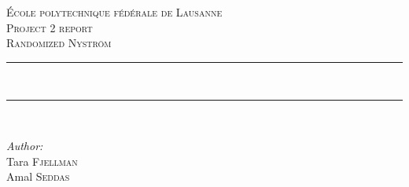 \begin{titlepage}
    \newcommand{\HRule}{\rule{\linewidth}{0.5mm}} %
    
    \center  %
     
    
    \vspace{3cm}
    \textsc{\LARGE École polytechnique fédérale de Lausanne}\\[1.5cm] %
    
    \textsc{\Large Project 2 report}\\[0.5cm] %
    \textsc{\large Randomized Nystr\"om
    }\\[0.5cm] %
    
    
    \HRule \\[0.4cm] %
    
    
    
    \HRule \\[1.5cm]
     
    
    \begin{minipage}{0.4\textwidth}
    \begin{flushleft} \large
    
    \emph{Author:}\\
    Tara \textsc{Fjellman}\\
    Amal \textsc{Seddas}\\
    
    
    
    
    \end{flushleft}
    \end{minipage}
    ~
    \begin{minipage}{0.4\textwidth}
    \begin{flushright} \large
    

\end{flushright}
\end{minipage}
\end{titlepage}
